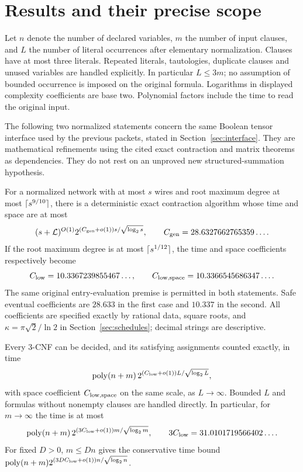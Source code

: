\section{Results and their precise scope}\label{sec:results}

Let $n$ denote the number of declared variables, $m$ the number of input
clauses, and $L$ the number of literal occurrences after elementary
normalization. Clauses have at most three literals. Repeated literals,
tautologies, duplicate clauses and unused variables are handled explicitly.
In particular $L\le3m$; no assumption of bounded occurrence is imposed on
the original formula. Logarithms in displayed complexity coefficients are
base two. Polynomial factors include the time to read the original input.

The following two normalized statements concern the same Boolean tensor
interface used by the previous packets, stated in Section~\ref{sec:interface}.
They are mathematical refinements using the cited exact contraction and
matrix theorems as dependencies. They do not rest on an unproved new
structured-summation hypothesis.

\begin{theorem}\label{thm:contractors}
For a normalized network with at most $s$ wires and root maximum degree at
most $\lceil s^{9/10}\rceil$, there is a deterministic exact contraction algorithm
whose time and space are at most
\[
 (s+\mathcal L)^{O(1)}
 2^{(C_{\rm gen}+o(1))s/\sqrt{\log_2s}},
 \qquad C_{\rm gen}=28.6327662765359\ldots.
\]
If the root maximum degree is at most $\lceil s^{1/12}\rceil$, the time and space
coefficients respectively become
\[
 C_{\rm low}=10.3367239855467\ldots,\qquad
 C_{\rm low,space}=10.3366545686347\ldots.
\]
The same original entry-evaluation premise is permitted in both statements.
Safe eventual coefficients are $28.633$ in the first case and $10.337$ in
the second. All coefficients are specified exactly by rational data, square
roots, and $\kappa=\pi\sqrt2/\ln2$ in Section~\ref{sec:schedules}; decimal
strings are descriptive.
\end{theorem}

\begin{theorem}\label{thm:sat}
Every 3-CNF can be decided, and its satisfying assignments counted exactly,
in time
\[
 \operatorname{poly}(n+m)\,
 2^{(C_{\rm low}+o(1))L/\sqrt{\log_2L}},
\]
with space coefficient $C_{\rm low,space}$ on the same scale, as $L\to\infty$.
Bounded $L$ and formulas without nonempty clauses are handled directly.
In particular, for $m\to\infty$ the time is at most
\[
 \operatorname{poly}(n+m)\,
 2^{(3C_{\rm low}+o(1))m/\sqrt{\log_2m}},
 \qquad 3C_{\rm low}=31.0101719566402\ldots.
\]
For fixed $D>0$, $m\le Dn$ gives the conservative time bound
$\operatorname{poly}(n+m)2^{(3DC_{\rm low}+o(1))n/\sqrt{\log_2n}}$.
\end{theorem}

